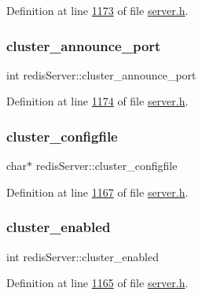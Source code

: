 Definition at line \hyperlink{server_8h_source_l01173}{1173} of file \hyperlink{server_8h_source}{server.\+h}.

\mbox{\label{structredisServer_a4e838de8aaf984056505f331eed49c1e}} 
\subsubsection{\texorpdfstring{cluster\+\_\+announce\+\_\+port}{cluster\_announce\_port}}
{\footnotesize\ttfamily int redis\+Server\+::cluster\+\_\+announce\+\_\+port}



Definition at line \hyperlink{server_8h_source_l01174}{1174} of file \hyperlink{server_8h_source}{server.\+h}.

\mbox{\label{structredisServer_ad074082bd522429c0804a6d6ac4632b4}} 
\subsubsection{\texorpdfstring{cluster\+\_\+configfile}{cluster\_configfile}}
{\footnotesize\ttfamily char$\ast$ redis\+Server\+::cluster\+\_\+configfile}



Definition at line \hyperlink{server_8h_source_l01167}{1167} of file \hyperlink{server_8h_source}{server.\+h}.

\mbox{\label{structredisServer_aeeb5fc691a101b3f2753c3774e378af7}} 
\subsubsection{\texorpdfstring{cluster\+\_\+enabled}{cluster\_enabled}}
{\footnotesize\ttfamily int redis\+Server\+::cluster\+\_\+enabled}



Definition at line \hyperlink{server_8h_source_l01165}{1165} of file \hyperlink{server_8h_source}{server.\+h}.

